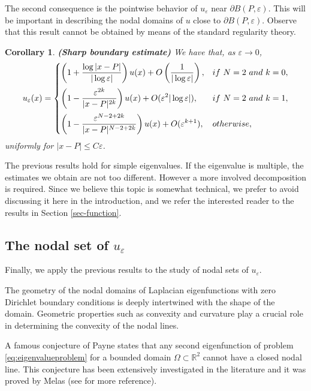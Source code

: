 \documentclass[11pt,reqno]{article}
\newtheorem{cor}[teo]{Corollary}
\numberwithin{equation}{section}
\newcommand\R{\mathbb R}
\newcommand\e\varepsilon
\renewcommand\O\Omega
\begin{document}
The second consequence is the pointwise behavior of $u_\varepsilon$ near $\partial B(P, \varepsilon)$. This will be important in describing the nodal domains of $u$ close to $\partial B(P, \varepsilon)$. Observe that this result cannot be obtained by means of the standard regularity theory.
\begin{cor}\label{T2}{\bf (Sharp boundary  estimate)}
		We have that, as $\e\to 0$,
        \begin{equation}\label{d2}
          u_\e(x)= 
          \begin{cases}
              \displaystyle  \left(1+\frac{\log |x-P|}{|\log\e|}\right)u(x)
              +O\left(\frac{1}{|\log\e|}\right), &if \ N=2  \ and\ k=0,\vspace{2mm}\\
			\displaystyle	  \left(1-\frac{\e^{2k}}{|x-P|^{2k}}\right)u(x)+O(\e^{2}|\log\e|),& if  \ N=2  \ and\ k=1,\vspace{2mm}\\
            \displaystyle        \left(1-\frac{\e^{N-2+2k}}{|x-P|^{N-2+2k}}
				\right)u(x)+O(\e^{k+1}), &otherwise,
                \end{cases}
        \end{equation}
		uniformly for $|x-P|\le C\e$.
	\end{cor}
The previous results hold for simple eigenvalues. If the eigenvalue is multiple, the estimates we obtain are not too different. However a more involved decomposition is required. Since we believe this topic is somewhat technical, we prefer to avoid discussing it here in the introduction, and we refer the interested reader to the results in Section \ref{sec-function}.





  \subsection{The nodal set of $u_\e$}\label{is3}

Finally, we apply the previous results to the study of nodal sets of $u_\e$.

The geometry of the nodal domains of Laplacian eigenfunctions with zero Dirichlet boundary conditions is deeply intertwined with the shape of the domain. Geometric properties such as convexity and  curvature play a crucial role in determining the convexity of the nodal lines.

 A famous conjecture of Payne \cite{payne1967} states that  any second eigenfunction of problem \eqref{eq:eigenvalueproblem} for a bounded domain $\O\subset\R^2$ cannot have a closed nodal line. This conjecture has been extensively investigated in the literature and it was proved by Melas \cite{melas1992} 
(see \cite{PU1990,MHTONN1997,BCM2021} for more reference).
\end{document}
